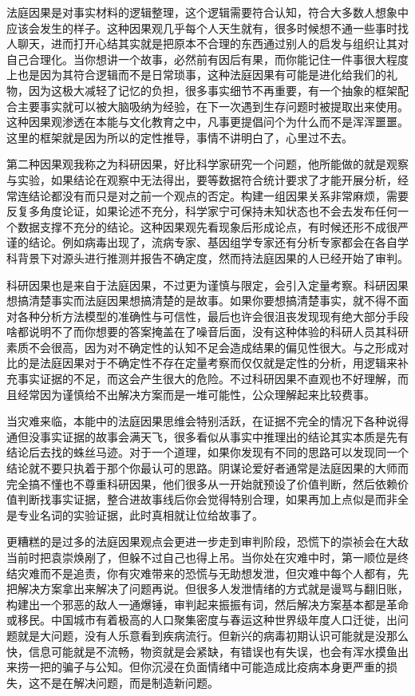 \documentclass[
]{book}
\begin{document}
法庭因果是对事实材料的逻辑整理，这个逻辑需要符合认知，符合大多数人想象中应该会发生的样子。这种因果观几乎每个人天生就有，很多时候想不通一些事时找人聊天，进而打开心结其实就是把原本不合理的东西通过别人的启发与组织让其对自己合理化。当你想讲一个故事，必然前有因后有果，而你能记住一件事很大程度上也是因为其符合逻辑而不是日常琐事，这种法庭因果有可能是进化给我们的礼物，因为这极大减轻了记忆的负担，很多事实细节不再重要，有一个抽象的框架配合主要事实就可以被大脑吸纳为经验，在下一次遇到生存问题时被提取出来使用。这种因果观渗透在本能与文化教育之中，凡事更提倡问个为什么而不是浑浑噩噩。这里的框架就是因为所以的定性推导，事情不讲明白了，心里过不去。

第二种因果观我称之为科研因果，好比科学家研究一个问题，他所能做的就是观察与实验，如果结论在观察中无法得出，要等数据符合统计要求了才能开展分析，经常连结论都没有而只是对之前一个观点的否定。构建一组因果关系非常麻烦，需要反复多角度论证，如果论述不充分，科学家宁可保持未知状态也不会去发布任何一个数据支撑不充分的结论。这种因果观先看现象后形成论点，有时候还形不成很严谨的结论。例如病毒出现了，流病专家、基因组学专家还有分析专家都会在各自学科背景下对源头进行推测并报告不确定度，然而持法庭因果的人已经开始了审判。

科研因果也是来自于法庭因果，不过更为谨慎与限定，会引入定量考察。科研因果想搞清楚事实而法庭因果想搞清楚的是故事。如果你要想搞清楚事实，就不得不面对各种分析方法模型的准确性与可信性，最后也许会很沮丧发现现有绝大部分手段啥都说明不了而你想要的答案掩盖在了噪音后面，没有这种体验的科研人员其科研素质不会很高，因为对不确定性的认知不足会造成结果的偏见性很大。与之形成对比的是法庭因果对于不确定性不存在定量考察而仅仅就是定性的分析，用逻辑来补充事实证据的不足，而这会产生很大的危险。不过科研因果不直观也不好理解，而且经常因为谨慎给不出解决方案而是一堆可能性，公众理解起来比较费事。

当灾难来临，本能中的法庭因果思维会特别活跃，在证据不完全的情况下各种说得通但没事实证据的故事会满天飞，很多看似从事实中推理出的结论其实本质是先有结论后去找的蛛丝马迹。对于一个道理，如果你发现有不同的思路可以发现同一个结论就不要只执着于那个你最认可的思路。阴谋论爱好者通常是法庭因果的大师而完全搞不懂也不尊重科研因果，他们很多从一开始就预设了价值判断，然后依赖价值判断找事实证据，整合进故事线后你会觉得特别合理，如果再加上点似是而非全是专业名词的实验证据，此时真相就让位给故事了。

更糟糕的是过多的法庭因果观点会更进一步走到审判阶段，恐慌下的崇祯会在大敌当前时把袁崇焕剐了，但躲不过自己也得上吊。当你处在灾难中时，第一顺位是终结灾难而不是追责，你有灾难带来的恐慌与无助想发泄，但灾难中每个人都有，先把解决方案拿出来解决了问题再说。但很多人发泄情绪的方式就是谩骂与翻旧账，构建出一个邪恶的敌人一通爆锤，审判起来振振有词，然后解决方案基本都是革命或移民。中国城市有着极高的人口聚集密度与春运这种世界级年度人口迁徙，出问题就是大问题，没有人乐意看到疾病流行。但新兴的病毒初期认识可能就是没那么快，信息可能就是不流畅，物资就是会紧缺，有错误也有失误，也会有浑水摸鱼出来捞一把的骗子与公知。但你沉浸在负面情绪中可能造成比疫病本身更严重的损失，这不是在解决问题，而是制造新问题。
\end{document}
